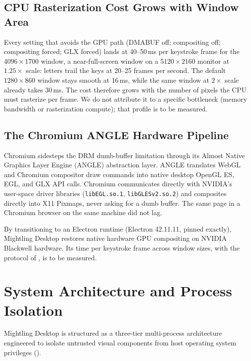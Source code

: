 \documentclass[11pt]{article}
\newcommand{\code}[1]{\texttt{#1}}
\begin{document}
\subsection{CPU Rasterization Cost Grows with Window Area}

Every setting that avoids the GPU path (DMABUF off; compositing off; compositing forced; GLX forced) lands at
40--50\,ms per keystroke frame for the $4096 \times 1700$ window, a near-full-screen window on a $5120 \times 2160$
monitor at $1.25\times$ scale: letters trail the keys at 20--25 frames per second. The default $1280 \times 860$
window stays smooth at 16\,ms, while the same window at $2\times$ scale already takes 30\,ms. The cost therefore grows
with the number of pixels the CPU must rasterize per frame. We do not attribute it to a specific bottleneck (memory
bandwidth or rasterization compute); that profile is to be measured.

\subsection{The Chromium ANGLE Hardware Pipeline}

Chromium sidesteps the DRM dumb-buffer limitation through its Almost Native Graphics Layer Engine (ANGLE) abstraction
layer. ANGLE translates WebGL and Chromium compositor draw commands into native desktop OpenGL ES, EGL, and GLX API calls.
Chromium communicates directly with NVIDIA's user-space driver libraries (\code{libEGL.so.1}, \code{libGLESv2.so.2}) and
composites directly into X11 Pixmaps, never asking for a dumb buffer. The same page in a Chromium browser on the same
machine did not lag.

By transitioning to an Electron runtime (Electron 42.11.11, pinned exactly), Mightling
Desktop restores native hardware GPU compositing on NVIDIA Blackwell hardware. Its time per keystroke frame across window
sizes, with the protocol of , is to be measured.

\section{System Architecture and Process Isolation}
\label{sec:system-arch}

Mightling Desktop is structured as a three-tier multi-process architecture engineered to isolate untrusted visual
components from host operating system privileges ().
\end{document}
